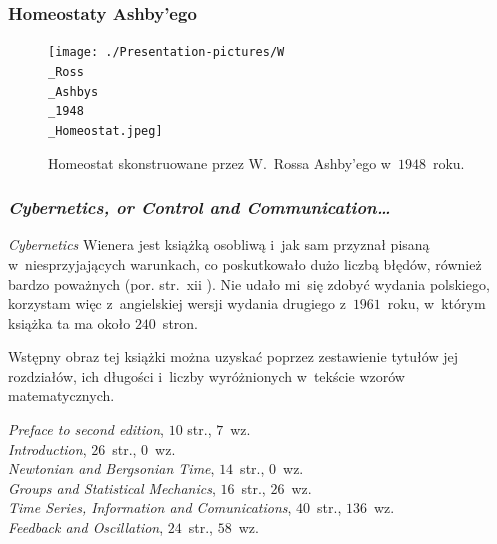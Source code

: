 \documentclass[10pt,t]{beamer}
\begin{document}
\begin{frame}
  \frametitle{Homeostaty Ashby’ego}


  \begin{figure}

    \centering


    \texttt{[image: ./Presentation-pictures/W\\\_Ross\\\_Ashbys\\\_1948\\\_Homeostat.jpeg]}


    \caption{
      {Homeostat} skonstruowane przez W.~Rossa Ashby’ego w~$1948$~roku.}


    \label{fig:Homeostat-01}

  \end{figure}

\end{frame}





\begin{frame}
  \frametitle{\textit{Cybernetics, or Control and
      Communication\ldots}}


  \textit{Cybernetics} Wienera jest książką osobliwą i~jak sam przyznał
  pisaną w~niesprzyjających warunkach, co poskutkowało dużo liczbą błędów,
  również bardzo poważnych (por. str.~xii
  \parencite{Wiener-Cybernetics-Second-edition-Pub-2016}). Nie udało mi~się
  zdobyć wydania polskiego, korzystam więc z~angielskiej wersji wydania
  drugiego z~$1961$~roku, w~którym książka ta ma około $240$~stron.

  Wstępny obraz tej książki można uzyskać poprzez zestawienie tytułów jej
  rozdziałów, ich długości i~liczby wyróżnionych w~tekście wzorów
  matematycznych.

  \textit{Preface to second edition}, $10$ str., $7$~wz. \\
  \textit{Introduction}, $26$~str., $0$~wz. \\
  \textit{Newtonian and Bergsonian Time}, $14$~str., $0$~wz. \\
  \textit{Groups and Statistical Mechanics}, $16$~str., $26$~wz. \\
  \textit{Time Series, Information and Comunications}, $40$~str.,
  $136$~wz. \\
  \textit{Feedback and Oscillation}, $24$~str., $58$~wz. \\

\end{frame}
\end{document}
